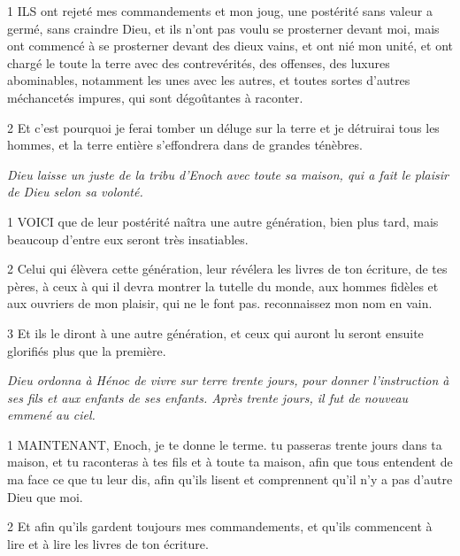 \par 1 ILS ont rejeté mes commandements et mon joug, une postérité sans valeur a germé, sans craindre Dieu, et ils n'ont pas voulu se prosterner devant moi, mais ont commencé à se prosterner devant des dieux vains, et ont nié mon unité, et ont chargé le toute la terre avec des contrevérités, des offenses, des luxures abominables, notamment les unes avec les autres, et toutes sortes d'autres méchancetés impures, qui sont dégoûtantes à raconter.

\par 2 Et c'est pourquoi je ferai tomber un déluge sur la terre et je détruirai tous les hommes, et la terre entière s'effondrera dans de grandes ténèbres.


\par \textit{Dieu laisse un juste de la tribu d'Enoch avec toute sa maison, qui a fait le plaisir de Dieu selon sa volonté.}

\par 1 VOICI que de leur postérité naîtra une autre génération, bien plus tard, mais beaucoup d'entre eux seront très insatiables.

\par 2 Celui qui élèvera cette génération, leur révélera les livres de ton écriture, de tes pères, à ceux à qui il devra montrer la tutelle du monde, aux hommes fidèles et aux ouvriers de mon plaisir, qui ne le font pas. reconnaissez mon nom en vain.

\par 3 Et ils le diront à une autre génération, et ceux qui auront lu seront ensuite glorifiés plus que la première.


\par \textit{Dieu ordonna à Hénoc de vivre sur terre trente jours, pour donner l'instruction à ses fils et aux enfants de ses enfants. Après trente jours, il fut de nouveau emmené au ciel.}

\par 1 MAINTENANT, Enoch, je te donne le terme. tu passeras trente jours dans ta maison, et tu raconteras à tes fils et à toute ta maison, afin que tous entendent de ma face ce que tu leur dis, afin qu'ils lisent et comprennent qu'il n'y a pas d'autre Dieu que moi.

\par 2 Et afin qu'ils gardent toujours mes commandements, et qu'ils commencent à lire et à lire les livres de ton écriture.

